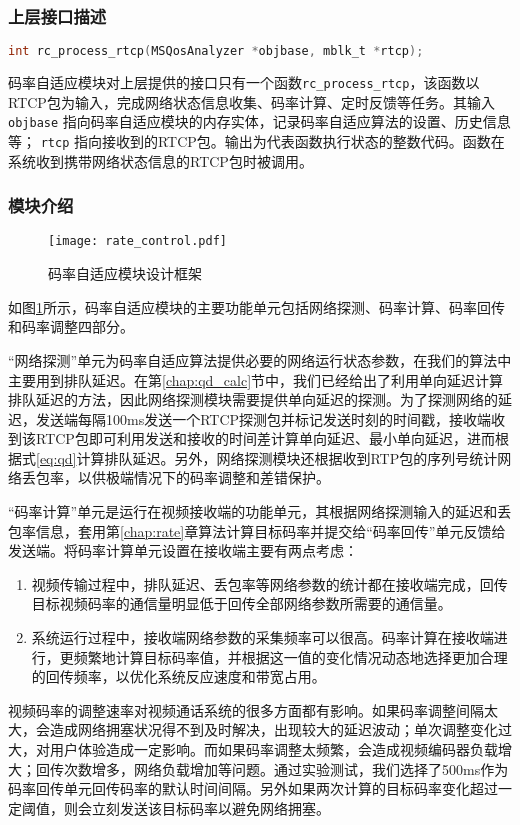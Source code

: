     \subsubsection{上层接口描述}
    \begin{lstlisting}[language=C]
int rc_process_rtcp(MSQosAnalyzer *objbase, mblk_t *rtcp);
    \end{lstlisting}
    
    码率自适应模块对上层提供的接口只有一个函数\lstinline!rc_process_rtcp!，该函数以RTCP包为输入，完成网络状态信息收集、码率计算、定时反馈等任务。其输入 \lstinline!objbase! 指向码率自适应模块的内存实体，记录码率自适应算法的设置、历史信息等； \lstinline!rtcp! 指向接收到的RTCP包。输出为代表函数执行状态的整数代码。函数在系统收到携带网络状态信息的RTCP包时被调用。

    \subsubsection{模块介绍}
    \begin{figure}[htbp]
      \centering
      \texttt{[image: rate\_control.pdf]}
      \caption{码率自适应模块设计框架}
      \label{fig:rate_control_arch}
    \end{figure}

    如图\ref{fig:rate_control_arch}所示，码率自适应模块的主要功能单元包括网络探测、码率计算、码率回传和码率调整四部分。

    ``网络探测''单元为码率自适应算法提供必要的网络运行状态参数，在我们的算法中主要用到排队延迟。在第\ref{chap:qd_calc}节中，我们已经给出了利用单向延迟计算排队延迟的方法，因此网络探测模块需要提供单向延迟的探测。为了探测网络的延迟，发送端每隔100ms发送一个RTCP探测包并标记发送时刻的时间戳，接收端收到该RTCP包即可利用发送和接收的时间差计算单向延迟、最小单向延迟，进而根据式\ref{eq:qd}计算排队延迟。另外，网络探测模块还根据收到RTP包的序列号统计网络丢包率，以供极端情况下的码率调整和差错保护。

    ``码率计算''单元是运行在视频接收端的功能单元，其根据网络探测输入的延迟和丢包率信息，套用第\ref{chap:rate}章算法计算目标码率并提交给``码率回传''单元反馈给发送端。将码率计算单元设置在接收端主要有两点考虑：
    \begin{enumerate}
        \item 视频传输过程中，排队延迟、丢包率等网络参数的统计都在接收端完成，回传目标视频码率的通信量明显低于回传全部网络参数所需要的通信量。
        \item 系统运行过程中，接收端网络参数的采集频率可以很高。码率计算在接收端进行，更频繁地计算目标码率值，并根据这一值的变化情况动态地选择更加合理的回传频率，以优化系统反应速度和带宽占用。
    \end{enumerate}
    视频码率的调整速率对视频通话系统的很多方面都有影响。如果码率调整间隔太大，会造成网络拥塞状况得不到及时解决，出现较大的延迟波动；单次调整变化过大，对用户体验造成一定影响。而如果码率调整太频繁，会造成视频编码器负载增大；回传次数增多，网络负载增加等问题。通过实验测试，我们选择了500ms作为码率回传单元回传码率的默认时间间隔。另外如果两次计算的目标码率变化超过一定阈值，则会立刻发送该目标码率以避免网络拥塞。

